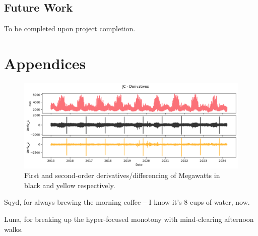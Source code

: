 \documentclass[sigconf]{acmart}
\begin{document}
\subsection{Future Work}
To be completed upon project completion.

\section{Appendices}

  \begin{figure}[hbt!]
    \includegraphics[width=\columnwidth]{Images/Deriv_Plot.png}
    \caption{First and second-order derivatives/differencing of Megawatts in black and yellow respectively.}
    \Description{}
    \label{fig:deriv}
  \end{figure}


\begin{acks}
 \hspace{3mm} Sqyd, for always brewing the morning coffee -- I know it's 8 cups of water, now.

Luna, for breaking up the hyper-focused monotony with mind-clearing afternoon walks.
\end{acks}





\appendix
\end{document}

